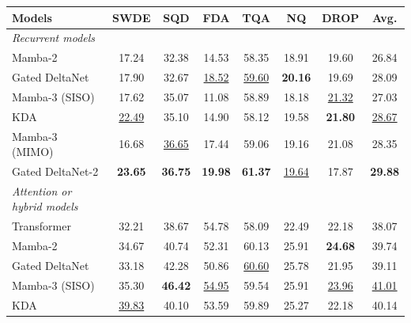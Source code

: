 \documentclass[10pt, logo, onecolumn, copyright]{nv}
\begin{document}
\begin{table}
\vspace{-0.5\baselineskip}
\centering
\footnotesize
\setlength{\tabcolsep}{1.3pt}
\setlength{\abovecaptionskip}{2pt}
\setlength{\belowcaptionskip}{-4pt}
\begin{tabular}{l|ccccccc}
\toprule
\textbf{Models} & \textbf{SWDE} & \textbf{SQD} & \textbf{FDA} & \textbf{TQA} & \textbf{NQ} & \textbf{DROP} & \textbf{Avg.} \\
\midrule
\midrule
\textit{Recurrent models} \\
\hspace{2mm} Mamba-2 & 17.24 & 32.38 & 14.53 & 58.35 & 18.91 & 19.60 & 26.84 \\
\hspace{2mm} Gated DeltaNet & 17.90 & 32.67 & \underline{18.52} & \underline{59.60} & \textbf{20.16} & 19.69 & 28.09 \\
\hspace{2mm} Mamba-3 (SISO) & 17.62 & 35.07 & 11.08 & 58.89 & 18.18 & \underline{21.32} & 27.03 \\
\hspace{2mm} KDA & \underline{22.49} & 35.10 & 14.90 & 58.12 & 19.58 & \textbf{21.80} & \underline{28.67} \\
\hspace{2mm} Mamba-3 (MIMO) & 16.68 & \underline{36.65} & 17.44 & 59.06 & 19.16 & 21.08 & 28.35 \\
\hspace{2mm} Gated DeltaNet-2 & \textbf{23.65} & \textbf{36.75} & \textbf{19.98} & \textbf{61.37} & \underline{19.64} & 17.87 & \textbf{29.88} \\
\midrule
\textit{Attention or hybrid models} \\
\hspace{2mm} Transformer & 32.21 & 38.67 & 54.78 & 58.09 & 22.49 & 22.18 & 38.07 \\
\hspace{2mm} Mamba-2 & 34.67 & 40.74 & 52.31 & 60.13 & 25.91 & \textbf{24.68} & 39.74 \\
\hspace{2mm} Gated DeltaNet & 33.18 & 42.28 & 50.86 & \underline{60.60} & 25.78 & 21.95 & 39.11 \\
\hspace{2mm} Mamba-3 (SISO) & 35.30 & \textbf{46.42} & \underline{54.95} & 59.54 & 25.91 & \underline{23.96} & \underline{41.01} \\
\hspace{2mm} KDA & \underline{39.83} & 40.10 & 53.59 & 59.89 & 25.27 & 22.18 & 40.14 \\

\end{tabular}
\end{table}
\end{document}
